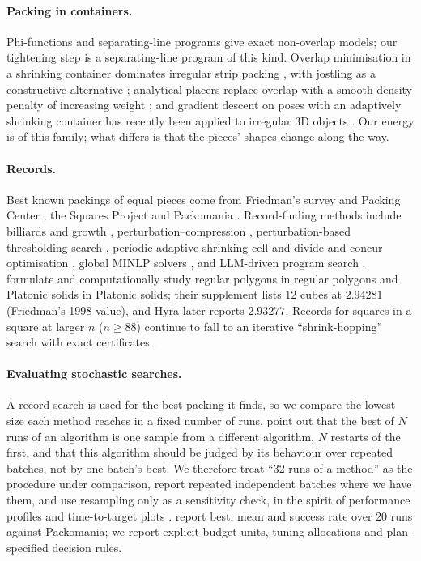 \paragraph{Packing in containers.} Phi-functions \citep{Bennell2010,Romanova2018} and separating-line programs \citep{Peralta2018} give exact non-overlap models; our tightening step is a separating-line program of this kind. Overlap minimisation in a shrinking container dominates irregular strip packing \citep{Umetani2009,Imamichi2009,Egeblad2007,Gardeyn2025}, with jostling as a constructive alternative \citep{Dowsland1998}; analytical placers replace overlap with a smooth density penalty of increasing weight \citep{Lu2015}; and gradient descent on poses with an adaptively shrinking container has recently been applied to irregular 3D objects \citep{Gupta2026}. Our energy is of this family; what differs is that the pieces' shapes change along the way.

\paragraph{Records.} Best known packings of equal pieces come from Friedman's survey and Packing Center \citep{friedmansurvey,friedmancenter}, the Squares Project \citep{squaresproject} and Packomania \citep{packomania}. Record-finding methods include billiards and growth \citep{lubachevsky,LubachevskyGraham1997}, perturbation--compression \citep{Gensane2004,gensane}, perturbation-based thresholding search \citep{Lai2023}, periodic adaptive-shrinking-cell and divide-and-concur optimisation \citep{TorquatoJiao2009,Kallus2010}, global MINLP solvers \citep{Berthold2026}, and LLM-driven program search \citep{Novikov2025,Georgiev2025,hyra}. \citet{Berthold2026} formulate and computationally study regular polygons in regular polygons and Platonic solids in Platonic solids; their supplement lists 12 cubes at $2.94281$ (Friedman's 1998 value), and Hyra \citep{hyra} later reports $2.93277$. Records for squares in a square at larger $n$ ($n\ge88$) continue to fall to an iterative ``shrink-hopping'' search with exact certificates \citep{squish}.

\paragraph{Evaluating stochastic searches.} A record search is used for the best packing it finds, so we compare the lowest size each method reaches in a fixed number of runs. \citet{Birattari2005} point out that the best of $N$ runs of an algorithm is one sample from a different algorithm, $N$ restarts of the first, and that this algorithm should be judged by its behaviour over repeated batches, not by one batch's best. We therefore treat ``32 runs of a method'' as the procedure under comparison, report repeated independent batches where we have them, and use resampling only as a sensitivity check, in the spirit of performance profiles and time-to-target plots \citep{Dolan2002,Aiex2007,Hansen2021}. \citet{Lai2023} report best, mean and success rate over 20 runs against Packomania; we report explicit budget units, tuning allocations and plan-specified decision rules.

